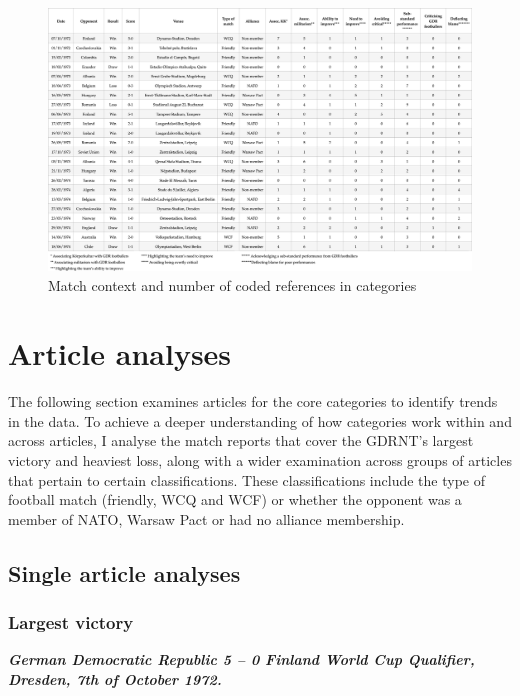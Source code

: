 \newpage
\begin{landscape}
\begin{figure}[!h]
\centering
\caption{Match context and number of coded references in categories}
\includegraphics[width=\linewidth]{mres/images/figure 3.2.png}
\end{figure}
\end{landscape}

\section*{Article analyses}

The following section examines articles for the core categories to identify trends in the data. To achieve a deeper understanding of how categories work within and across articles, I analyse the match reports that cover the GDRNT’s largest victory and heaviest loss, along with a wider examination across groups of articles that pertain to certain classifications. These classifications include the type of football match (friendly, WCQ and WCF) or whether the opponent was a member of NATO, Warsaw Pact or had no alliance membership. 

\subsection*{Single article analyses}

\subsubsection*{Largest victory}

\textbf{\textit{German Democratic Republic 5 – 0 Finland
\newline World Cup Qualifier, Dresden, 7th of October 1972.}}

